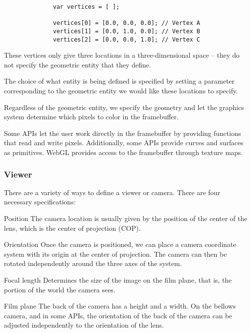 \documentclass[../COS3712_Notes.tex]{subfiles}
\begin{document}
          \begin{example}
            \begin{verbatim}
              var vertices = [ ];

              vertices[0] = [0.0, 0.0, 0.0]; // Vertex A
              vertices[1] = [0.0, 1.0, 0.0]; // Vertex B
              vertices[2] = [0.0, 0.0, 1.0]; // Vertex C
            \end{verbatim}

            These vertices only give three locations in a three-dimensional space
            -- they do not specify the geometric entity that they define.

            The choice of what entity is being defined is specified by
            setting a parameter corresponding to the geometric entity we would like these locations
            to specify.

            Regardless of the geometric entity, we specify the geometry
            and let the graphics system determine which pixels to color in the framebuffer.
          \end{example}

          Some APIs let the user work directly in the framebuffer by
          providing functions that read and write pixels.
          Additionally, some APIs provide curves and surfaces as primitives.
          WebGL provides access to the framebuffer through texture maps.

        \pagebreak

        \subsubsection{Viewer}
          There are a variety of ways to define a viewer or camera.
          There are four necessary specifications:
          \begin{indentparagraph}
            \begin{descriptenum}[nosep]
              \item[Position] The camera location is usually given by the position of 
                the center of the lens, which is the center of projection (COP).
              \item[Orientation] Once the camera is positioned,
                we can place a camera coordinate system
                with its origin at the center of projection.
                The camera can then be rotated independently around the three axes of the system.
              \item[Focal length] Determines the size of the image on the film plane,
                that is, the portion of the world the camera sees.
              \item[Film plane] The back of the camera has a height and a width.
                On the bellows camera, and in some APIs, the orientation of the back of the camera
                can be adjusted independently to the orientation of the lens.
            \end{descriptenum}
          \end{indentparagraph}
\end{document}
